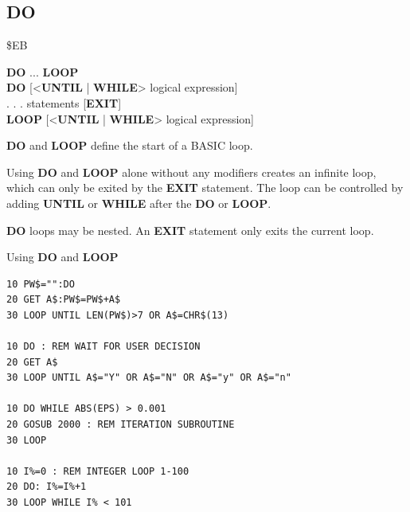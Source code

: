 
\newpage
\subsection{DO}
\begin{description}[leftmargin=2cm,style=nextline]
\item [Token:] \$EB
\item [Format:] {\bf DO} ... {\bf LOOP} \\
                {\bf DO} [<{\bf UNTIL} | {\bf WHILE}> logical expression] \\
                . . . statements [{\bf EXIT}] \\
                {\bf LOOP} [<{\bf UNTIL} | {\bf WHILE}> logical expression]
\item [Usage:] {\bf DO} and {\bf LOOP} define
               the start of a BASIC loop.

               Using {\bf DO} and {\bf LOOP} alone without any
               modifiers creates an infinite loop, which can only be exited
               by the {\bf EXIT} statement. The loop can be
               controlled by adding {\bf UNTIL} or {\bf WHILE}
               after the {\bf DO} or {\bf LOOP}.

\item [Remarks:] {\bf DO} loops may be nested. An {\bf EXIT} statement
               only exits the current loop.
\item [Examples:] Using {\bf DO} and {\bf LOOP}
\begin{tcolorbox}[colback=black,coltext=white]
\verbatimfont{\codefont}
\begin{verbatim}
10 PW$="":DO
20 GET A$:PW$=PW$+A$
30 LOOP UNTIL LEN(PW$)>7 OR A$=CHR$(13)

10 DO : REM WAIT FOR USER DECISION
20 GET A$
30 LOOP UNTIL A$="Y" OR A$="N" OR A$="y" OR A$="n"

10 DO WHILE ABS(EPS) > 0.001
20 GOSUB 2000 : REM ITERATION SUBROUTINE
30 LOOP

10 I%=0 : REM INTEGER LOOP 1-100
20 DO: I%=I%+1
30 LOOP WHILE I% < 101
\end{verbatim}
\end{tcolorbox}
\end{description}


\newpage
